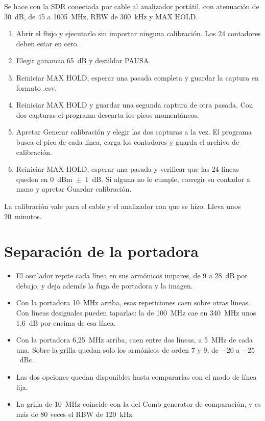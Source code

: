 Se hace con la SDR conectada por cable al analizador portátil, con atenuación de 30~dB, de 45 a 1005~MHz, RBW de 300~kHz y MAX HOLD.

\begin{enumerate}
  \item Abrir el flujo y ejecutarlo sin importar ninguna calibración. Los 24 contadores deben estar en cero.
  \item Elegir ganancia 65~dB y destildar PAUSA.
  \item Reiniciar MAX HOLD, esperar una pasada completa y guardar la captura en formato .csv.
  \item Reiniciar MAX HOLD y guardar una segunda captura de otra pasada. Con dos capturas el programa descarta los picos momentáneos.
  \item Apretar Generar calibración y elegir las dos capturas a la vez. El programa busca el pico de cada línea, carga los contadores y guarda el archivo de calibración.
  \item Reiniciar MAX HOLD, esperar una pasada y verificar que las 24 líneas queden en 0~dBm~$\pm$~1~dB. Si alguna no lo cumple, corregir su contador a mano y apretar Guardar calibración.
\end{enumerate}

La calibración vale para el cable y el analizador con que se hizo. Lleva unos 20~minutos.

\section{Separación de la portadora}\label{anexo:separacion}

\begin{itemize}
  \item El oscilador repite cada línea en sus armónicos impares, de 9 a 28~dB por debajo, y deja además la fuga de portadora y la imagen.
  \item Con la portadora 10~MHz arriba, esas repeticiones caen sobre otras líneas. Con líneas desiguales pueden taparlas: la de 100~MHz cae en 340~MHz unos 1,6~dB por encima de esa línea.
  \item Con la portadora 6,25~MHz arriba, caen entre dos líneas, a 5~MHz de cada una. Sobre la grilla quedan solo los armónicos de orden 7 y 9, de $-20$ a $-25$~dBc.
  \item Las dos opciones quedan disponibles hasta compararlas con el modo de línea fija.
  \item La grilla de 10~MHz coincide con la del Comb generator de comparación, y es más de 80 veces el RBW de 120~kHz.
\end{itemize}
